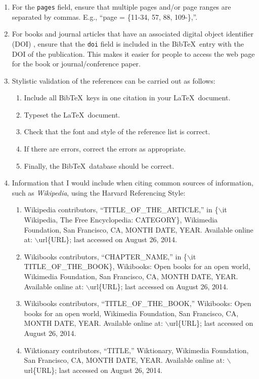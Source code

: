 \documentclass[letter,12pt]{article}
\begin{document}
\begin{enumerate}
\item For the {\tt pages} field, ensure that multiple pages and/or page ranges are separated by commas. E.g., ``page = \{11-34, 57, 88, 109-\},''.
\item For books and journal articles that have an associated digital object identifier (DOI) \cite{InternationalDOIFoundationStaff2017}, ensure that the {\tt doi} field is included in the {\sc Bib}\TeX\ entry with the DOI of the publication. This makes it easier for people to access the web page for the book or journal/conference paper.
\item Stylistic validation of the references can be carried out as follows: \vspace{-0.3cm}
	\begin{enumerate} \itemsep -2pt
	\item Include all {\sc Bib}\TeX\ keys in one citation in your \LaTeX\ document.
	\item Typeset the \LaTeX\ document.
	\item Check that the font and style of the reference list is correct.
	\item If there are errors, correct the errors as appropriate.
	\item Finally, the {\sc Bib}\TeX\ database should be correct.
	\end{enumerate}
\item Information that I would include when citing common sources of information, such as {\it Wikipedia}, using the Harvard Referencing Style: \vspace{-0.3cm}
	\begin{enumerate} \itemsep -2pt
	\item Wikipedia contributors, ``TITLE\_OF\_THE\_ARTICLE,'' in \{$\backslash$it Wikipedia, The Free Encyclopedia: CATEGORY\}, Wikimedia Foundation, San Francisco, CA, MONTH DATE, YEAR. Available online at: $\backslash$url\{URL\}; last accessed on August 26, 2014.
	\item Wikibooks contributors, ``CHAPTER\_NAME,'' in \{$\backslash$it TITLE\_OF\_THE\_BOOK\}, Wikibooks: Open books for an open world, Wikimedia Foundation, San Francisco, CA, MONTH DATE, YEAR. Available online at: $\backslash$url\{URL\}; last accessed on August 26, 2014.
	\item Wikibooks contributors, ``TITLE\_OF\_THE\_BOOK,'' Wikibooks: Open books for an open world, Wikimedia Foundation, San Francisco, CA, MONTH DATE, YEAR. Available online at: $\backslash$url\{URL\}; last accessed on August 26, 2014.
	\item Wiktionary contributors, ``TITLE,'' Wiktionary, Wikimedia Foundation, San Francisco, CA, MONTH DATE, YEAR. Available online at: $\backslash$url\{URL\}; last accessed on August 26, 2014.

\end{enumerate}
\end{enumerate}
\end{document}
